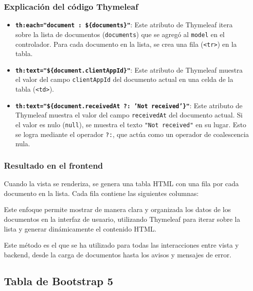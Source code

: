 \documentclass[draft]{scrbook}
\begin{document}
\subsubsection{Explicación del código Thymeleaf}

\begin{itemize}
    \item \textbf{\texttt{th:each="document : \$\{documents\}"}}:
    Este atributo de Thymeleaf itera sobre la lista de documentos (\texttt{documents}) que se agregó al \texttt{model} en el controlador. Para cada documento en la lista, se crea una fila (\texttt{<tr>}) en la tabla.

    \item \textbf{\texttt{th:text="\$\{document.clientAppId\}"}}:
    Este atributo de Thymeleaf muestra el valor del campo \texttt{clientAppId} del documento actual en una celda de la tabla (\texttt{<td>}).

    \item \textbf{\texttt{th:text="\$\{document.receivedAt ?: 'Not received'\}"}}:
    Este atributo de Thymeleaf muestra el valor del campo \texttt{receivedAt} del documento actual. Si el valor es nulo (\texttt{null}), se muestra el texto \texttt{"Not received"} en su lugar. Esto se logra mediante el operador \texttt{?:}, que actúa como un operador de coalescencia nula.
\end{itemize}

\subsubsection{Resultado en el frontend}

Cuando la vista se renderiza, se genera una tabla HTML con una fila por cada documento en la lista. Cada fila contiene las siguientes columnas:


Este enfoque permite mostrar de manera clara y organizada los datos de los documentos en la interfaz de usuario, utilizando Thymeleaf para iterar sobre la lista y generar dinámicamente el contenido HTML.

Este método es el que se ha utilizado para todas las interacciones entre vista y backend, desde la carga de documentos hasta los avisos y mensajes de error. 



\subsection{Tabla de Bootstrap 5}
\label{subsec:bootstrap-table}
\end{document}
